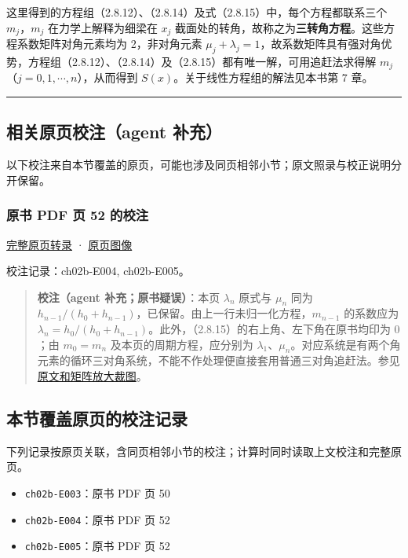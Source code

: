 \documentclass[
  10pt,
  fontset=fandol]{ctexart}
\providecommand{\tightlist}{%
  \setlength{\itemsep}{0pt}\setlength{\parskip}{0pt}}
\begin{document}
这里得到的方程组（2.8.12）、（2.8.14）及式（2.8.15）中，每个方程都联系三个 \(m_j\)，\(m_j\) 在力学上解释为细梁在 \(x_j\) 截面处的转角，故称之为\textbf{三转角方程}。这些方程系数矩阵对角元素均为 2，非对角元素 \(\mu_j+\lambda_j=1\)，故系数矩阵具有强对角优势，方程组（2.8.12）、（2.8.14）及（2.8.15）都有唯一解，可用追赶法求得解 \(m_j\)（\(j=0,1,\cdots,n\)），从而得到 \(S(x)\)。关于线性方程组的解法见本书第 7 章。

\begin{center}\rule{0.5\linewidth}{0.5pt}\end{center}

\subsection{相关原页校注（agent 补充）}\label{ux76f8ux5173ux539fux9875ux6821ux6ce8agent-ux8865ux5145}

以下校注来自本节覆盖的原页，可能也涉及同页相邻小节；原文照录与校正说明分开保留。

\subsubsection{原书 PDF 页 52 的校注}\label{ux539fux4e66-pdf-ux9875-52-ux7684ux6821ux6ce8}

\href{../pages/pdf-052.md}{完整原页转录} · \href{../../source-images/pdf-052.jpeg}{原页图像}

校注记录：ch02b-E004, ch02b-E005。

\begin{quote}
\textbf{校注（agent 补充；原书疑误）}：本页 \(\lambda_n\) 原式与 \(\mu_n\) 同为 \(h_{n-1}/(h_0+h_{n-1})\)，已保留。由上一行未归一化方程，\(m_{n-1}\) 的系数应为 \(\lambda_n=h_0/(h_0+h_{n-1})\)。此外，（2.8.15）的右上角、左下角在原书均印为 \(0\)；由 \(m_0=m_n\) 及本页的周期方程，应分别为 \(\lambda_1\)、\(\mu_n\)。对应系统是有两个角元素的循环三对角系统，不能不作处理便直接套用普通三对角追赶法。参见\href{../assets/ch02b/pdf-052-periodic-system-detail.png}{原文和矩阵放大裁图}。
\end{quote}

\subsection{本节覆盖原页的校注记录}\label{ux672cux8282ux8986ux76d6ux539fux9875ux7684ux6821ux6ce8ux8bb0ux5f55}

下列记录按原页关联，含同页相邻小节的校注；计算时同时读取上文校注和完整原页。

\begin{itemize}
\tightlist
\item
  \texttt{ch02b-E003}：原书 PDF 页 50
\item
  \texttt{ch02b-E004}：原书 PDF 页 52
\item
  \texttt{ch02b-E005}：原书 PDF 页 52
\end{itemize}
\end{document}
